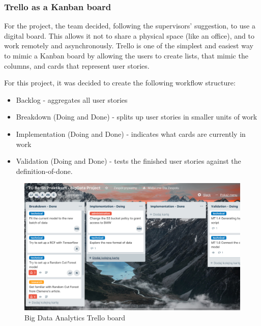                 \subsubsection{Trello as a Kanban board}
For the project, the team decided, following the supervisors’ suggestion, to use a digital board. This allows it not to share a physical space (like an office), and to work remotely and asynchronously. Trello is one of the simplest and easiest way to mimic a Kanban board by allowing the users to create lists, that mimic the columns, and cards that represent user stories.

For this project, it was decided to create the following workflow structure:
    \begin{itemize}
        \item Backlog - aggregates all user stories
        \item Breakdown (Doing and Done) - splits up user stories in smaller units of work
        \item Implementation (Doing and Done) - indicates what cards are currently in work
        \item Validation (Doing and Done) - tests the finished user stories against the definition-of-done.
    \end{itemize}

    \begin{figure}[h]
        \centering
        \includegraphics[width=1\textwidth]{images/trello.png}
        \caption{Big Data Analytics Trello board }
        \label{fig:trello_board_1}
    \end{figure}
    
